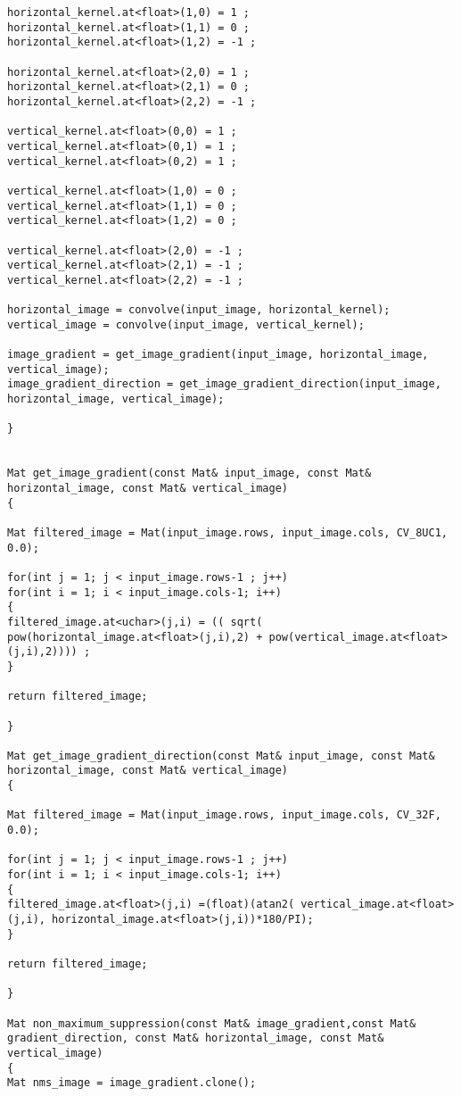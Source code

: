 \begin{lstlisting}
horizontal_kernel.at<float>(1,0) = 1 ;
horizontal_kernel.at<float>(1,1) = 0 ;
horizontal_kernel.at<float>(1,2) = -1 ;

horizontal_kernel.at<float>(2,0) = 1 ;
horizontal_kernel.at<float>(2,1) = 0 ;
horizontal_kernel.at<float>(2,2) = -1 ;

vertical_kernel.at<float>(0,0) = 1 ;
vertical_kernel.at<float>(0,1) = 1 ;
vertical_kernel.at<float>(0,2) = 1 ;

vertical_kernel.at<float>(1,0) = 0 ;
vertical_kernel.at<float>(1,1) = 0 ;
vertical_kernel.at<float>(1,2) = 0 ;

vertical_kernel.at<float>(2,0) = -1 ;
vertical_kernel.at<float>(2,1) = -1 ;
vertical_kernel.at<float>(2,2) = -1 ;

horizontal_image = convolve(input_image, horizontal_kernel); 
vertical_image = convolve(input_image, vertical_kernel);

image_gradient = get_image_gradient(input_image, horizontal_image, vertical_image);
image_gradient_direction = get_image_gradient_direction(input_image, horizontal_image, vertical_image);

}


Mat get_image_gradient(const Mat& input_image, const Mat& horizontal_image, const Mat& vertical_image)
{

Mat filtered_image = Mat(input_image.rows, input_image.cols, CV_8UC1, 0.0);

for(int j = 1; j < input_image.rows-1 ; j++)
for(int i = 1; i < input_image.cols-1; i++)
{
filtered_image.at<uchar>(j,i) = (( sqrt( pow(horizontal_image.at<float>(j,i),2) + pow(vertical_image.at<float>(j,i),2)))) ;
}

return filtered_image;

}

Mat get_image_gradient_direction(const Mat& input_image, const Mat& horizontal_image, const Mat& vertical_image)
{

Mat filtered_image = Mat(input_image.rows, input_image.cols, CV_32F, 0.0);

for(int j = 1; j < input_image.rows-1 ; j++)
for(int i = 1; i < input_image.cols-1; i++)
{
filtered_image.at<float>(j,i) =(float)(atan2( vertical_image.at<float>(j,i), horizontal_image.at<float>(j,i))*180/PI);
}

return filtered_image;

}

Mat non_maximum_suppression(const Mat& image_gradient,const Mat& gradient_direction, const Mat& horizontal_image, const Mat& vertical_image)
{
Mat nms_image = image_gradient.clone();


\end{lstlisting}
